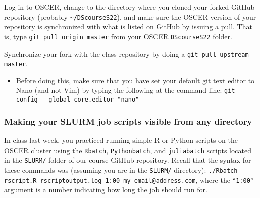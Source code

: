 \documentclass[12pt,english]{exam}
\begin{document}
\begin{questions}
\question Log in to OSCER, change to the directory where you cloned your forked GitHub repository (probably \texttt{\textasciitilde/DScourseS22}), and make sure the OSCER version of your repository is synchronized with what is listed on GitHub by issuing a pull. That is, type \texttt{git pull origin master} from your OSCER \texttt{DScourseS22} folder. 

\question Synchronize your fork with the class repository by doing a \texttt{git pull upstream master}. 
\begin{itemize}
	\item Before doing this, make sure that you have set your default git text editor to Nano (and not Vim) by typing the following at the command line: \texttt{git config -{}-global core.editor "nano"}
\end{itemize}

\subsubsection*{Making your SLURM job scripts visible from any directory}

\question In class last week, you practiced running simple R or Python scripts on the OSCER cluster using the \texttt{Rbatch}, \texttt{Pythonbatch}, and \texttt{juliabatch} scripts located in the \texttt{SLURM/} folder of our course GitHub repository. Recall that the syntax for these commands was (assuming you are in the \texttt{SLURM/} directory): \texttt{./Rbatch rscript.R rscriptoutput.log 1:00 my-email@address.com}, where the ``\texttt{1:00}'' argument is a number indicating how long the job should run for.


\end{questions}
\end{document}
